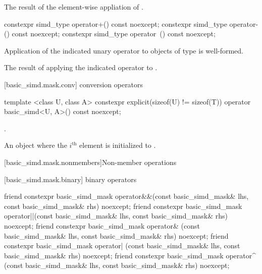\begin{itemdescr}
  \pnum\returns
  The result of the element-wise appliation of .
\end{itemdescr}

\begin{itemdecl}
constexpr simd_type operator+() const noexcept;
constexpr simd_type operator-() const noexcept;
constexpr simd_type operator~() const noexcept;
\end{itemdecl}

\begin{itemdescr}
  \pnum\constraints
  Application of the indicated unary operator to objects of type  is well-formed.

  \pnum\returns
  The result of applying the indicated operator to .
\end{itemdescr}

[basic_simd.mask.conv]{ conversion operators}

\begin{itemdecl}
template <class U, class A>
  constexpr explicit(sizeof(U) != sizeof(T)) operator basic_simd<U, A>() const noexcept;
\end{itemdecl}

\begin{itemdescr}
  \pnum\constraints
  .

  \pnum\returns
  An object where the $i^\text{th}$ element is initialized to .
\end{itemdescr}

[basic_simd.mask.nonmembers]{Non-member operations}

[basic_simd.mask.binary]{ binary operators}

\begin{itemdecl}
friend constexpr basic_simd_mask operator&&(const basic_simd_mask& lhs, const basic_simd_mask& rhs) noexcept;
friend constexpr basic_simd_mask operator||(const basic_simd_mask& lhs, const basic_simd_mask& rhs) noexcept;
friend constexpr basic_simd_mask operator& (const basic_simd_mask& lhs, const basic_simd_mask& rhs) noexcept;
friend constexpr basic_simd_mask operator| (const basic_simd_mask& lhs, const basic_simd_mask& rhs) noexcept;
friend constexpr basic_simd_mask operator^ (const basic_simd_mask& lhs, const basic_simd_mask& rhs) noexcept;
\end{itemdecl}

